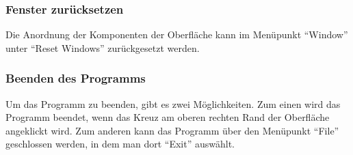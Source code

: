 \subsubsection{Fenster zurücksetzen}
Die Anordnung der Komponenten der Oberfläche kann im Menüpunkt ``Window'' unter ``Reset Windows'' zurückgesetzt werden.

\subsubsection{Beenden des Programms}
Um das Programm zu beenden, gibt es zwei Möglichkeiten. Zum einen wird das Programm beendet, wenn das Kreuz am oberen rechten Rand der Oberfläche angeklickt wird. Zum anderen kann das Programm über den Menüpunkt ``File'' geschlossen werden, in dem man dort ``Exit'' auswählt.
